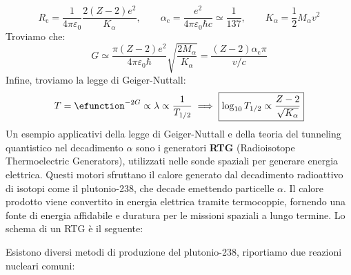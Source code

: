 \begin{equation}
    R_{\text{c}} = \dfrac{1}{4\pi \varepsilon_0} \dfrac{2(Z-2) e^2}{K_\alpha}, \qquad \alpha_{\text{c}} = \dfrac{e^2}{4\pi \varepsilon_0 \hbar c} \simeq \dfrac{1}{137}, \qquad K_\alpha = \dfrac{1}{2}M_\alpha v^2
\end{equation}
Troviamo che:
\begin{equation}
    G \simeq \dfrac{\pi (Z-2) e^2}{4\pi \varepsilon_0 \hbar} \sqrt{\dfrac{2M_\alpha}{K_\alpha}} = \dfrac{(Z-2) \alpha_{\text{c}} \pi}{v/c}
\end{equation}
Infine, troviamo la legge di Geiger-Nuttall:
\begin{equation}
    T = \efunction^{-2G} \propto \lambda \propto \dfrac{1}{T_{1/2}} \implies \boxed{\log_{10} T_{1/2} \propto \dfrac{Z-2}{\sqrt{K_\alpha}}}
\end{equation}
Un esempio applicativi della legge di Geiger-Nuttall e della teoria del tunneling quantistico nel decadimento $\alpha$ sono i generatori \textbf{RTG} (Radioisotope Thermoelectric Generators), utilizzati nelle sonde spaziali per generare energia elettrica. Questi motori sfruttano il calore generato dal decadimento radioattivo di isotopi come il plutonio-238, che decade emettendo particelle $\alpha$. Il calore prodotto viene convertito in energia elettrica tramite termocoppie, fornendo una fonte di energia affidabile e duratura per le missioni spaziali a lungo termine. Lo schema di un RTG è il seguente:


Esistono diversi metodi di produzione del plutonio-238, riportiamo due reazioni nucleari comuni:


